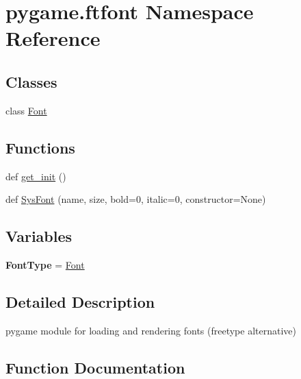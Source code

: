 \hypertarget{namespacepygame_1_1ftfont}{}\section{pygame.\+ftfont Namespace Reference}
\label{namespacepygame_1_1ftfont}
\subsection*{Classes}
\begin{DoxyCompactItemize}
\item 
class \hyperlink{classpygame_1_1ftfont_1_1_font}{Font}
\end{DoxyCompactItemize}
\subsection*{Functions}
\begin{DoxyCompactItemize}
\item 
def \hyperlink{namespacepygame_1_1ftfont_a0e836cc8e76fc482a4d0f5b187b4dd31}{get\+\_\+init} ()
\item 
def \hyperlink{namespacepygame_1_1ftfont_a1e2a89b4d0dfdbaee9aadb6b2293c5c5}{Sys\+Font} (name, size, bold=0, italic=0, constructor=None)
\end{DoxyCompactItemize}
\subsection*{Variables}
\begin{DoxyCompactItemize}
\item 
\mbox{\label{namespacepygame_1_1ftfont_a985c280ffaf90d929036dd6fc23dc72d}} 
{\bfseries Font\+Type} = \hyperlink{classpygame_1_1ftfont_1_1_font}{Font}
\end{DoxyCompactItemize}


\subsection{Detailed Description}
\begin{DoxyVerb}pygame module for loading and rendering fonts (freetype alternative)\end{DoxyVerb}
 

\subsection{Function Documentation}
\mbox{\label{namespacepygame_1_1ftfont_a0e836cc8e76fc482a4d0f5b187b4dd31}} 
